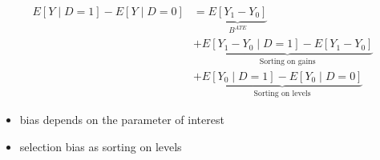\begin{frame}
	\begin{align*}
		E[Y\mid D = 1] - E[Y\mid D = 0] & = \underbrace{E[Y_1 - Y_0]}_{B^{ATE}} \\
		& + \underbrace{E[Y_1 - Y_0 \mid D = 1] - E[Y_1 - Y_0]}_{\text{Sorting on gains}} \\
		& + \underbrace{E[Y_0\mid D = 1] - E[Y_0 \mid D = 0]}_{\text{Sorting on levels}}
	\end{align*}
\end{frame}
\begin{frame}
	\begin{itemize}\setlength\itemsep{1em}
	\item bias depends on the parameter of interest
	\item selection bias as sorting on levels
	\end{itemize}
\end{frame}

